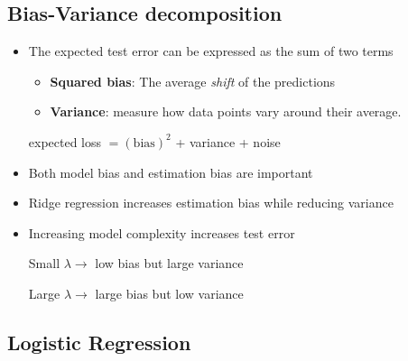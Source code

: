\subsection{Bias-Variance decomposition}
\begin{itemize}
	\item The expected test error can be expressed as the sum of two terms
	\begin{itemize}
	 	\item \textbf{Squared bias}: The average \textit{shift} of the predictions 
	 	\item \textbf{Variance}: measure how data points vary around their average.
	 \end{itemize} 
	 \begin{center}
	 	expected loss $= (\text{bias})^2$ + variance + noise
	 \end{center}
	\item Both model bias and estimation bias are important
	\item Ridge regression increases estimation bias while reducing variance
	\item Increasing model complexity increases test error
	\begin{center}
		Small $\lambda \rightarrow$ low bias but large variance
	\end{center}
	\begin{center}
		Large $\lambda \rightarrow$ large bias but low variance
	\end{center}
\end{itemize}

\subsection{Logistic Regression}

